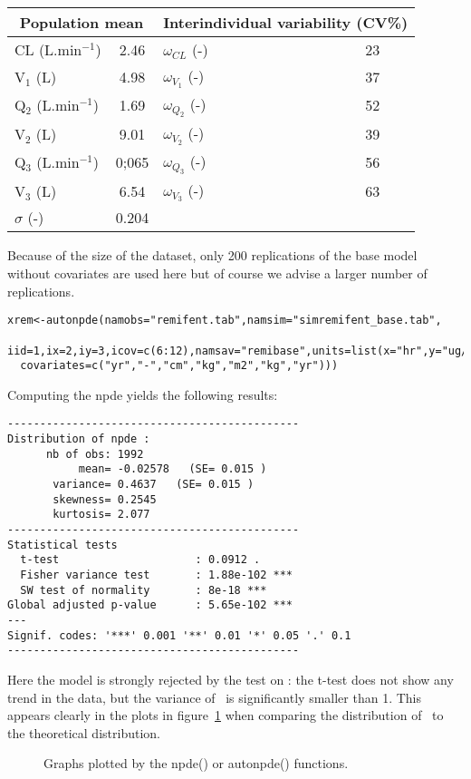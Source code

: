 \begin{center}
\begin{tabular} {l c | l c}
\hline 
\multicolumn{2}{c}{Population mean} & \multicolumn{2}{c}{Interindividual variability (CV\%)} \\
\hline 
CL (L.min$^{-1}$) & 2.46 & $\omega_{CL}$ (-) & 23 \\
V$_1$ (L) & 4.98 & $\omega_{V_1}$ (-) & 37 \\
Q$_2$ (L.min$^{-1}$) & 1.69 & $\omega_{Q_2}$ (-) & 52 \\
V$_2$ (L) & 9.01 & $\omega_{V_2}$ (-) & 39 \\
Q$_3$ (L.min$^{-1}$) & 0;065 & $\omega_{Q_3}$ (-) & 56 \\
V$_3$ (L) & 6.54 & $\omega_{V_3}$ (-) & 63 \\
$\sigma$ (-) & 0.204 \\
\hline
\end{tabular}
\end{center}

Because of the size of the dataset, only 200 replications of the base model without covariates are used here but of course we advise a larger number of replications.
\begin{verbatim}
xrem<-autonpde(namobs="remifent.tab",namsim="simremifent_base.tab",
  iid=1,ix=2,iy=3,icov=c(6:12),namsav="remibase",units=list(x="hr",y="ug/L",
  covariates=c("yr","-","cm","kg","m2","kg","yr")))
\end{verbatim}

Computing the npde yields the following results:
\begin{verbatim}
---------------------------------------------
Distribution of npde :
      nb of obs: 1992
           mean= -0.02578   (SE= 0.015 )
       variance= 0.4637   (SE= 0.015 )
       skewness= 0.2545
       kurtosis= 2.077
---------------------------------------------
Statistical tests
  t-test                     : 0.0912 .
  Fisher variance test       : 1.88e-102 ***
  SW test of normality       : 8e-18 ***
Global adjusted p-value      : 5.65e-102 ***
---
Signif. codes: '***' 0.001 '**' 0.01 '*' 0.05 '.' 0.1
---------------------------------------------
\end{verbatim}
Here the model is strongly rejected by the test on \npde: the t-test does not show any trend in the data, but the variance of \npde~is significantly smaller than 1. This appears clearly in the plots in figure~\ref{fig:remi.default} when comparing the distribution of \npde~to the theoretical distribution. 
\begin{figure}[!h]
\par\kern -0.3cm
\begin{center}
\end{center}
\caption{Graphs plotted by the {\sf npde()} or {\sf autonpde()}
functions.}\label{fig:remi.default}
\end{figure}
\newpage

